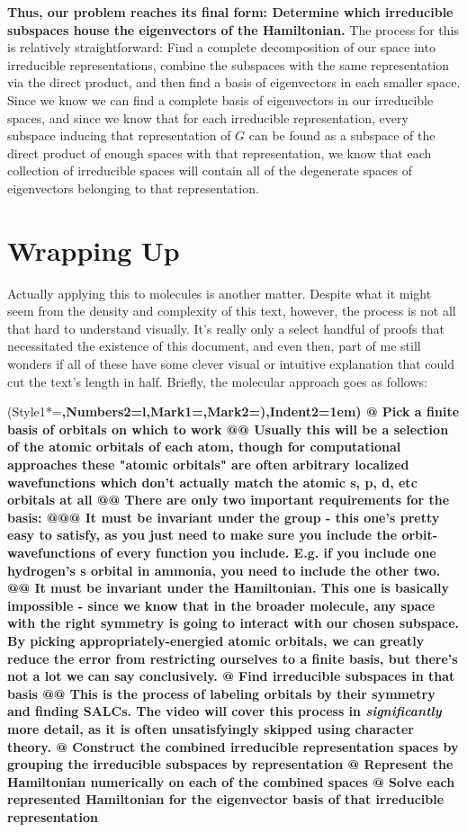 \documentclass{article}
\begin{document}
\textbf{Thus, our problem reaches its final form: Determine which irreducible subspaces house the eigenvectors of the Hamiltonian.} The process for this is relatively straightforward: Find a complete decomposition of our space into irreducible representations, combine the subspaces with the same representation via the direct product, and then find a basis of eigenvectors in each smaller space. Since we know we can find a complete basis of eigenvectors in our irreducible spaces, and since we know that for each irreducible representation, every subspace inducing that representation of $G$ can be found as a subspace of the direct product of enough spaces with that representation, we know that each collection of irreducible spaces will contain all of the degenerate spaces of eigenvectors belonging to that representation. 


\section{Wrapping Up}
Actually applying this to molecules is another matter. Despite what it might seem from the density and complexity of this text, however, the process is not all that hard to understand visually. It's really only a select handful of proofs that necessitated the existence of this document, and even then, part of me still wonders if all of these have some clever visual or intuitive explanation that could cut the text's length in half. Briefly, the molecular approach goes as follows:
\begin{easylist}
  \ListProperties(Style1*=\bfseries,Numbers2=l,Mark1={},Mark2={)},Indent2=1em)
  @ Pick a finite basis of orbitals on which to work
  @@ Usually this will be a selection of the atomic orbitals of each atom, though for computational approaches these "atomic orbitals" are often arbitrary localized wavefunctions which don't actually match the atomic s, p, d, etc orbitals at all
  @@ There are only two important requirements for the basis:
  @@@ It must be invariant under the group - this one's pretty easy to satisfy, as you just need to make sure you include the orbit-wavefunctions of every function you include. E.g. if you include one hydrogen's s orbital in ammonia, you need to include the other two.
  @@ It must be invariant under the Hamiltonian. This one is basically impossible - since we know that in the broader molecule, any space with the right symmetry is going to interact with our chosen subspace. By picking appropriately-energied atomic orbitals, we can greatly reduce the error from restricting ourselves to a finite basis, but there's not a lot we can say conclusively.
  @ Find irreducible subspaces in that basis
  @@ This is the process of labeling orbitals by their symmetry and finding SALCs. The video will cover this process in \textit{significantly} more detail, as it is often unsatisfyingly skipped using character theory.
  @ Construct the combined irreducible representation spaces by grouping the irreducible subspaces by representation
  @ Represent the Hamiltonian numerically on each of the combined spaces
  @ Solve each represented Hamiltonian for the eigenvector basis of that irreducible representation
\end{easylist}
\end{document}
